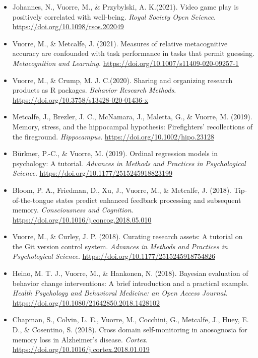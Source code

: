 \documentclass[12pt, a4paper]{article}
\newcommand{\years}[1]{\marginnote{\scriptsize #1}}
\begin{document}
\begin{itemize}
  \item Johannes, N.\footnotemark[1], Vuorre, M.\footnotemark[1], \& Przybylski, A. K.\footnotemark[1] (2021). Video game play is positively correlated with well-being. \emph{Royal Society Open Science}. \url{https://doi.org/10.1098/rsos.202049}
  \item Vuorre, M., \& Metcalfe, J. (2021). Measures of relative metacognitive accuracy are confounded with task performance in tasks that permit guessing. \emph{Metacognition and Learning.} \url{https://doi.org/10.1007/s11409-020-09257-1}

  \item \years{2020} Vuorre, M.\footnotemark[1], \& Crump, M. J. C.\footnotemark[1] (2020). Sharing and organizing research products as R packages. \emph{Behavior Research Methods}. \url{https://doi.org/10.3758/s13428-020-01436-x}
  \item \years{2019} Metcalfe, J., Brezler, J. C., McNamara, J., Maletta, G., \& Vuorre, M. (2019). Memory, stress, and the hippocampal hypothesis: Firefighters' recollections of the fireground. \emph{Hippocampus}. \url{https://doi.org/10.1002/hipo.23128}
  \item Bürkner, P.-C., \& Vuorre, M. (2019). Ordinal regression models in psychology: A tutorial. \emph{Advances in Methods and Practices in Psychological Science}. \url{https://doi.org/10.1177/2515245918823199}
  \item \years{2018} Bloom, P. A., Friedman, D., Xu, J., Vuorre, M., \& Metcalfe, J. (2018). Tip-of-the-tongue states predict enhanced feedback processing and subsequent memory. \emph{Consciousness and Cognition}. \url{https://doi.org/10.1016/j.concog.2018.05.010}
  \item Vuorre, M., \& Curley, J. P. (2018). Curating research assets: A tutorial on the Git version control system. \emph{Advances in Methods and Practices in Psychological Science}. \url{https://doi.org/10.1177/2515245918754826}
  \item Heino, M. T. J.\footnotemark[1], Vuorre, M.\footnotemark[1], \& Hankonen, N. (2018). Bayesian evaluation of behavior change interventions: A brief introduction and a practical example. \emph{Health Psychology and Behavioral Medicine: an Open Access Journal}. \url{https://doi.org/10.1080/21642850.2018.1428102}
  \item Chapman, S., Colvin, L. E., Vuorre, M., Cocchini, G., Metcalfe, J., Huey, E. D., \& Cosentino, S. (2018). Cross domain self-monitoring in anosognosia for memory loss in Alzheimer's disease. \emph{Cortex}. \url{https://doi.org/10.1016/j.cortex.2018.01.019}

\end{itemize}
\end{document}
